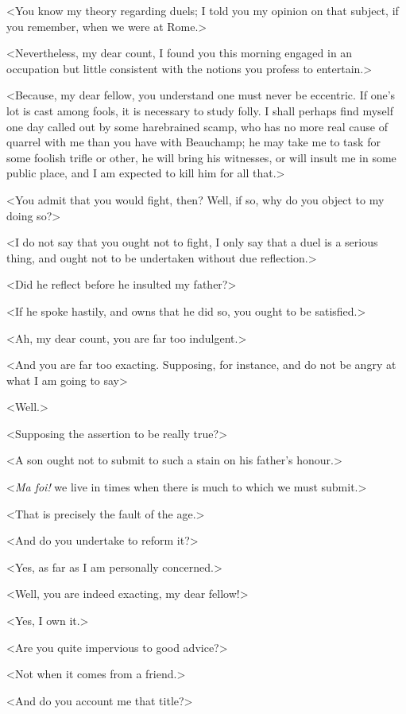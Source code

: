  <You know my theory regarding duels; I told you my opinion on that subject, if you remember, when we were at Rome.> 

 <Nevertheless, my dear count, I found you this morning engaged in an occupation but little consistent with the notions you profess to entertain.> 

 <Because, my dear fellow, you understand one must never be eccentric. If one's lot is cast among fools, it is necessary to study folly. I shall perhaps find myself one day called out by some harebrained scamp, who has no more real cause of quarrel with me than you have with Beauchamp; he may take me to task for some foolish trifle or other, he will bring his witnesses, or will insult me in some public place, and I am expected to kill him for all that.> 

 <You admit that you would fight, then? Well, if so, why do you object to my doing so?> 

 <I do not say that you ought not to fight, I only say that a duel is a serious thing, and ought not to be undertaken without due reflection.> 

 <Did he reflect before he insulted my father?> 

 <If he spoke hastily, and owns that he did so, you ought to be satisfied.> 

 <Ah, my dear count, you are far too indulgent.> 

 <And you are far too exacting. Supposing, for instance, and do not be angry at what I am going to say\longdash> 

 <Well.> 

 <Supposing the assertion to be really true?> 

 <A son ought not to submit to such a stain on his father's honour.> 

 <\textit{Ma foi!} we live in times when there is much to which we must submit.> 

 <That is precisely the fault of the age.> 

 <And do you undertake to reform it?> 

 <Yes, as far as I am personally concerned.> 

 <Well, you are indeed exacting, my dear fellow!> 

 <Yes, I own it.> 

 <Are you quite impervious to good advice?> 

 <Not when it comes from a friend.> 

 <And do you account me that title?> 

